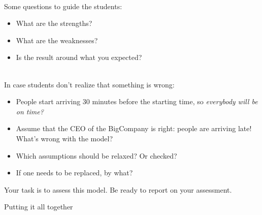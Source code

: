 \hfill \\

\begin{annotation}
	\begin{notes}

Some questions to guide the students:
	\begin{itemize}
	\item What are the strengths?
	\item What are the weaknesses?
	\item Is the result around what you expected?
\end{itemize}	
	
\hfill \\
In case students don't realize that something is wrong:
\begin{itemize}
	\item People start arriving 30 minutes before the starting time, so \emph{everybody will be on time?}
	\item Assume that the CEO of the BigCompany is right: people are arriving late! What's wrong with the model?

	\item Which assumptions should be relaxed? Or checked?
	\item If one needs to be replaced, by what?
	\end{itemize}
	
	\end{notes}
\end{annotation}

Your task is to assess this model.
Be ready to report on your assessment.



















\newpage


%
%



\begin{module}{Putting it all together}
	\label{report}

	
	
\end{module}



